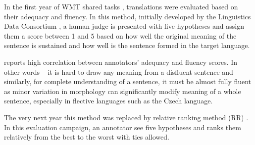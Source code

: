 In the first year of WMT shared tasks \citep{koehn-monz:2006:WMT}, translations were evaluated based on their adequacy and fluency. 
In this method, initially  developed by the Linguistics Data Consortium ,  a human judge is presented with five hypotheses and assign them a score between 1 and 5 based on how well the original meaning of the sentence is sustained and how well is the sentence formed in the target language.

\cite{callison-burch-etal-2007-meta} reports high correlation between annotators’ adequacy and fluency scores. In other words -- it is hard to draw any meaning from a disfluent sentence and similarly, for complete understanding of a sentence, it must be almost fully fluent as minor variation in morphology can significantly modify meaning of a whole sentence, especially in flective languages such as the Czech language. 

The very next year this method was replaced by relative ranking method (RR) \citep{callison-burch-etal-2007-meta}. In this evaluation campaign, an annotator see five hypotheses and ranks them relatively from the best to the worst with ties allowed.


